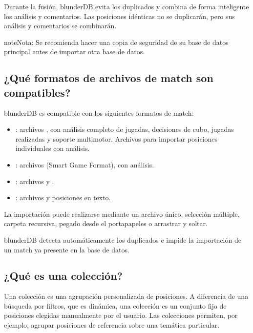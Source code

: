 \documentclass[letterpaper,10pt,spanish]{sphinxmanual}
\begin{document}
\sphinxAtStartPar
Durante la fusión, blunderDB evita los duplicados y combina de forma inteligente los análisis y comentarios. Las posiciones idénticas no se duplicarán, pero sus análisis y comentarios se combinarán.

\begin{sphinxadmonition}{note}{Nota:}
\sphinxAtStartPar
Se recomienda hacer una copia de seguridad de su base de datos principal antes de importar otra base de datos.
\end{sphinxadmonition}


\subsection{¿Qué formatos de archivos de match son compatibles?}
\label{\detokenize{faq:quels-formats-de-fichiers-de-match-sont-supportes}}
\sphinxAtStartPar
blunderDB es compatible con los siguientes formatos de match:
\begin{itemize}
\item {} 
\sphinxAtStartPar
{}: archivos , con análisis completo de jugadas, decisiones de cubo, jugadas realizadas y soporte multimotor. Archivos  para importar posiciones individuales con análisis.

\item {} 
\sphinxAtStartPar
{}: archivos  (Smart Game Format), con análisis.

\item {} 
\sphinxAtStartPar
{}: archivos  y .

\item {} 
\sphinxAtStartPar
{}: archivos  y posiciones en texto.

\end{itemize}

\sphinxAtStartPar
La importación puede realizarse mediante un archivo único, selección múltiple, carpeta recursiva, pegado desde el portapapeles o arrastrar y soltar.

\sphinxAtStartPar
blunderDB detecta automáticamente los duplicados e impide la importación de un match ya presente en la base de datos.


\subsection{¿Qué es una colección?}
\label{\detokenize{faq:qu-est-ce-qu-une-collection}}
\sphinxAtStartPar
Una colección es una agrupación personalizada de posiciones. A diferencia de una búsqueda por filtros, que es dinámica, una colección es un conjunto fijo de posiciones elegidas manualmente por el usuario. Las colecciones permiten, por ejemplo, agrupar posiciones de referencia sobre una temática particular.
\end{document}
